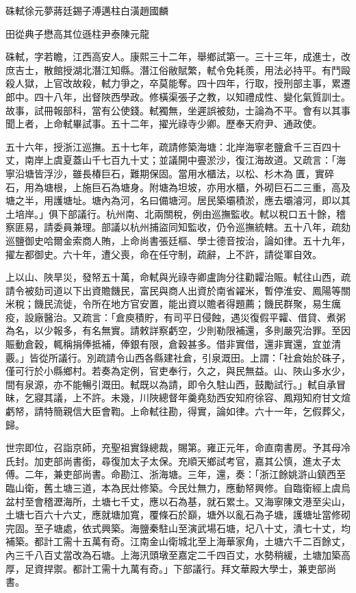 
\begin{pinyinscope}
硃軾徐元夢蔣廷錫子溥邁柱白潢趙國麟

田從典子懋高其位遜柱尹泰陳元龍

硃軾，字若瞻，江西高安人。康熙三十二年，舉鄉試第一。三十三年，成進士，改庶吉士，散館授湖北潛江知縣。潛江俗敝賦繁，軾令免耗羨，用法必持平。有鬥毆殺人獄，上官改故殺，軾力爭之，卒莫能奪。四十四年，行取，授刑部主事，累遷郎中。四十八年，出督陜西學政。修橫渠張子之教，以知禮成性、變化氣質訓士。故事，試冊報部科，當有公使錢。軾獨無，坐遲誤被劾，士論為不平。會有以其事聞上者，上命軾畢試事。五十二年，擢光祿寺少卿。歷奉天府尹、通政使。

五十六年，授浙江巡撫。五十七年，疏請修築海塘：北岸海寧老鹽倉千三百四十丈，南岸上虞夏蓋山千七百九十丈；並議開中亹淤沙，復江海故道。又疏言：「海寧沿塘皆浮沙，雖長椿巨石，難期保固。當用水櫃法，以松、杉木為匱，實碎石，用為塘根，上施巨石為塘身。附塘為坦坡，亦用水櫃，外砌巨石二三重，高及塘之半，用護塘址。塘內為河，名曰備塘河。居民築壩積淤，應去壩濬河，即以其土培岸。」俱下部議行。杭州南、北兩關稅，例由巡撫監收。軾以稅口五十餘，稽察匪易，請委員兼理。部議以杭州捕盜同知監收，仍令巡撫統轄。五十八年，疏劾巡鹽御史哈爾金索商人賄，上命尚書張廷樞、學士德音按治，論如律。五十九年，擢左都御史。六十年，遭父喪，命在任守制，疏辭，上不許，請從軍自效。

上以山、陜旱災，發帑五十萬，命軾與光祿寺卿盧詢分往勸糶治賑。軾往山西，疏請令被劾司道以下出資贍饑民，富民與商人出資於南省糴米，暫停淮安、鳳陽等關米稅；饑民流徙，令所在地方官安置，能出資以贍者得題薦；饑民群聚，易生癘疫，設廠醫治。又疏言：「倉庾積貯，有司平日侵蝕，遇災復假平糶、借貸、煮粥為名，以少報多，有名無實。請敕詳察虧空，少則勒限補還，多則嚴究治罪。至因賑動倉穀，輒稱捐俸抵補，俸銀有限，倉穀甚多。借非實借，還非實還，宜並清覈。」皆從所議行。別疏請令山西各縣建社倉，引泉溉田。上謂：「社倉始於硃子，僅可行於小縣鄉村。若奏為定例，官吏奉行，久之，與民無益。山、陜山多水少，間有泉源，亦不能暢引溉田。軾既以為請，即令久駐山西，鼓勵試行。」軾自承冒昧，乞寢其議，上不許。未幾，川陜總督年羹堯劾西安知府徐容、鳳翔知府甘文煊虧帑，請特簡親信大臣會鞫。上命軾往勘，得實，論如律。六十一年，乞假葬父，歸。

世宗即位，召詣京師，充聖祖實錄總裁，賜第。雍正元年，命直南書房。予其母冷氏封。加吏部尚書銜，尋復加太子太保。充順天鄉試考官，嘉其公慎，進太子太傅。二年，兼吏部尚書。命勘江、浙海塘。三年，還，奏：「浙江餘姚滸山鎮西至臨山衛，舊土塘三道，本為民灶修築。今民灶無力，應動帑興修。自臨衛經上虞烏盆村至會稽瀝海所，土塘七千丈，應以石為基，就石累土。又海寧陳文港至尖山，土塘七百六十六丈，應就塘加寬，覆條石於巔，塘外以亂石為子塘，護塘址當修砌完固。至子塘處，依式興築。海鹽秦駐山至演武場石塘，圮八十丈，潰七十丈，均補築。都計工需十五萬有奇。江南金山衛城北至上海華家角，土塘六千二百餘丈，內三千八百丈當改為石塘。上海汛頭墩至嘉定二千四百丈，水勢稍緩，土塘加築高厚，足資捍禦。都計工需十九萬有奇。」下部議行。拜文華殿大學士，兼吏部尚書。


\end{pinyinscope}
